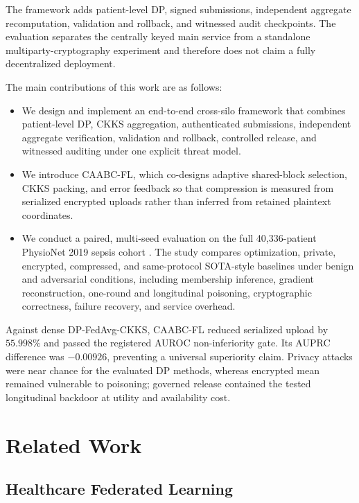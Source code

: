 \documentclass[conference]{IEEEtran}
\begin{document}
The framework adds patient-level DP, signed submissions, independent aggregate
recomputation, validation and rollback, and witnessed audit checkpoints. The
evaluation separates the centrally keyed main service from a standalone
multiparty-cryptography experiment and therefore does not claim a fully
decentralized deployment.

The main contributions of this work are as follows:

\begin{itemize}
    \item We design and implement an end-to-end cross-silo framework that
    combines patient-level DP, CKKS aggregation, authenticated submissions,
    independent aggregate verification, validation and rollback, controlled
    release, and witnessed auditing under one explicit threat model.

    \item We introduce CAABC-FL, which co-designs adaptive shared-block
    selection, CKKS packing, and error feedback so that compression is measured
    from serialized encrypted uploads rather than inferred from retained
    plaintext coordinates.

    \item We conduct a paired, multi-seed evaluation on the full 40,336-patient
    PhysioNet 2019 sepsis cohort \cite{reyna2020early,physionet2019sepsis}. The
    study compares optimization, private, encrypted, compressed, and
    same-protocol SOTA-style baselines under benign and adversarial conditions,
    including membership inference, gradient reconstruction, one-round and
    longitudinal poisoning, cryptographic correctness, failure recovery, and
    service overhead.
\end{itemize}

Against dense DP-FedAvg-CKKS, CAABC-FL reduced serialized upload by $55.998\%$
and passed the registered AUROC non-inferiority gate. Its AUPRC difference was
$-0.00926$, preventing a universal superiority claim. Privacy attacks were near
chance for the evaluated DP methods, whereas encrypted mean remained vulnerable
to poisoning; governed release contained the tested longitudinal backdoor at
utility and availability cost.

\section{Related Work}
\label{sec:related-work}

\subsection{Healthcare Federated Learning}
\end{document}
